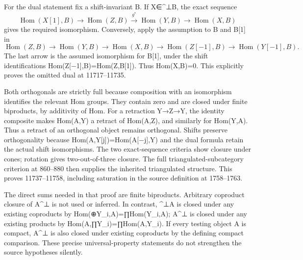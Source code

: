 For the dual statement fix a shift-invariant B. If X\allowbreak{}∈\textasciicircum{}⊥B,\allowbreak{} the exact sequence \[
 \operatorname{Hom}(X[1],B)\longrightarrow\operatorname{Hom}(Z,B)
 \xrightarrow{g^*}\operatorname{Hom}(Y,B)
 \longrightarrow\operatorname{Hom}(X,B)
\] gives the required isomorphism. Conversely,\allowbreak{} apply the assumption to B and B[1]\allowbreak{} in \[
 \operatorname{Hom}(Z,B)\longrightarrow\operatorname{Hom}(Y,B)
 \longrightarrow\operatorname{Hom}(X,B)
 \longrightarrow\operatorname{Hom}(Z[-1],B)
 \longrightarrow\operatorname{Hom}(Y[-1],B).
\] The last arrow is the assumed isomorphism for B[1]\allowbreak{},\allowbreak{} under the shift identifications Hom(Z[−1]\allowbreak{},\allowbreak{}B)\allowbreak{}\allowbreak{}=Hom(Z,\allowbreak{}B[1]\allowbreak{})\allowbreak{}. Thus Hom(X,\allowbreak{}B)\allowbreak{}\allowbreak{}=0. This explicitly proves the omitted dual at 11717–\allowbreak{}11735.

Both orthogonals are strictly full because composition with an isomorphism identifies the relevant Hom groups. They contain zero and are closed under finite biproducts,\allowbreak{} by additivity of Hom. For a retraction Y\allowbreak{}→Z\allowbreak{}→Y,\allowbreak{} the identity composite makes Hom(A,\allowbreak{}Y)\allowbreak{} a retract of Hom(A,\allowbreak{}Z)\allowbreak{},\allowbreak{} and similarly for Hom(Y,\allowbreak{}A)\allowbreak{}. Thus a retract of an orthogonal object remains orthogonal. Shifts preserve orthogonality because Hom(A,\allowbreak{}Y[j]\allowbreak{})\allowbreak{}\allowbreak{}=Hom(A[−j]\allowbreak{},\allowbreak{}Y)\allowbreak{} and the dual formula retain the actual shift isomorphisms. The two exact-sequence criteria show closure under cones; rotation gives two-out-of-three closure. The full triangulated-subcategory criterion at 860–\allowbreak{}880 then supplies the inherited triangulated structure. This proves 11737–\allowbreak{}11758,\allowbreak{} including saturation in the source definition at 1758–\allowbreak{}1763.

The direct sums needed in that proof are finite biproducts. Arbitrary coproduct closure of A\^{}⊥ is not used or inferred. In contrast,\allowbreak{} \^{}⊥A is closed under any existing coproducts by Hom(\allowbreak{}⊕Y\_\allowbreak{}i,\allowbreak{}A)\allowbreak{}\allowbreak{}=∏Hom(Y\_\allowbreak{}i,\allowbreak{}A)\allowbreak{}; A\^{}⊥ is closed under any existing products by Hom(A,\allowbreak{}∏Y\_\allowbreak{}i)\allowbreak{}\allowbreak{}=∏Hom(A,\allowbreak{}Y\_\allowbreak{}i)\allowbreak{}. If every testing object A is compact,\allowbreak{} A\^{}⊥ is also closed under existing coproducts by the defining compact comparison. These precise universal-property statements do not strengthen the source hypotheses silently.

